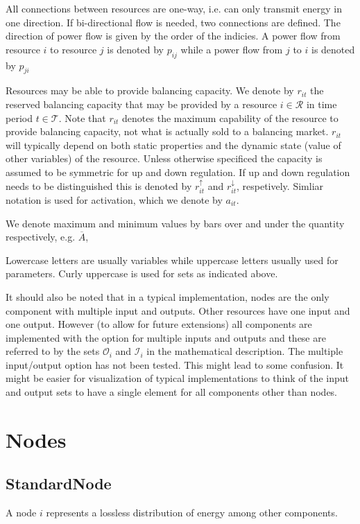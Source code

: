 \documentclass[]{report}
\newcommand{\resources}{\mathcal{R}}
\newcommand{\timesteps}{\mathcal{T}}
\newcommand{\outputs}{\mathcal{O}}
\newcommand{\inputs}{\mathcal{I}}
\begin{document}
All connections between resources are one-way, i.e. can only transmit energy in one direction. If bi-directional flow is needed, two connections are defined. The direction of power flow is given by the order of the indicies. A power flow from resource $i$ to resource $j$ is denoted by $p_{ij}$ while a power flow from $j$ to $i$ is denoted by $p_{ji}$

Resources may be able to provide balancing capacity. We denote by $r_{it}$ the reserved balancing capacity that may be provided by a resource $i \in \resources$ in time period $t \in \timesteps$. Note that $r_{it}$ denotes the maximum capability of the resource to provide balancing capacity, not what is actually sold to a balancing market. $r_{it}$ will typically depend on both static properties and the dynamic state (value of other variables) of the resource. Unless otherwise specificed the capacity is assumed to be symmetric for up and down regulation. If up and down regulation needs to be distinguished this is denoted by $r^{\uparrow}_{it}$ and $r^{\downarrow}_{it}$, respetively. Simliar notation is used for activation, which we denote by $a_{it}$.

We denote maximum and minimum values by bars over and under the quantity respectively, e.g. $\overline{A}$, 

Lowercase letters are usually variables while uppercase letters usually used for parameters. Curly uppercase is used for sets as indicated above.

It should also be noted that in a typical implementation, nodes are the only component with multiple input and outputs. Other resources have one input and one output. However (to allow for future extensions) all components are implemented with the option for multiple inputs and outputs and these are referred to by the sets $\outputs_i$ and $\inputs_i$ in the mathematical description. The multiple input/output option has not been tested. This might lead to some confusion. It might be easier for visualization of typical implementations to think of the input and output sets to have a single element for all components other than nodes.

\newpage
\section{Nodes}
\subsection{StandardNode}
A node $i$ represents a lossless distribution of energy among other components. 
\end{document}
